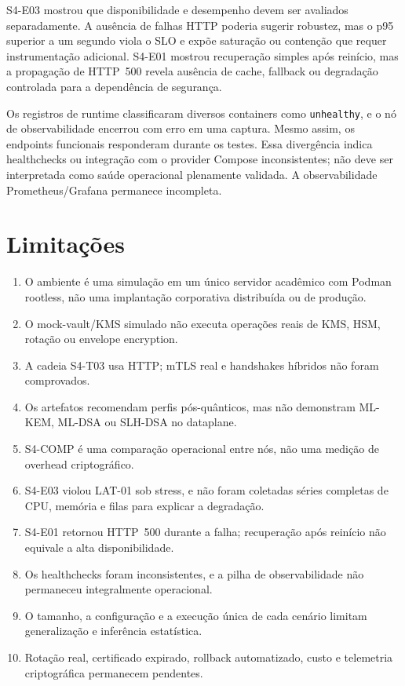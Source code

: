\documentclass[12pt]{article}
\begin{document}
S4-E03 mostrou que disponibilidade e desempenho devem ser avaliados separadamente. A aus\^encia de falhas HTTP poderia sugerir robustez, mas o p95 superior a um segundo viola o SLO e exp\~oe satura\c{c}\~ao ou conten\c{c}\~ao que requer instrumenta\c{c}\~ao adicional. S4-E01 mostrou recupera\c{c}\~ao simples ap\'os rein\'icio, mas a propaga\c{c}\~ao de HTTP~500 revela aus\^encia de cache, fallback ou degrada\c{c}\~ao controlada para a depend\^encia de seguran\c{c}a.

Os registros de runtime classificaram diversos containers como \texttt{unhealthy}, e o n\'o de observabilidade encerrou com erro em uma captura. Mesmo assim, os endpoints funcionais responderam durante os testes. Essa diverg\^encia indica healthchecks ou integra\c{c}\~ao com o provider Compose inconsistentes; n\~ao deve ser interpretada como sa\'ude operacional plenamente validada. A observabilidade Prometheus/Grafana permanece incompleta.

\section{Limita\c{c}\~oes}
\begin{enumerate}
\item O ambiente \'e uma simula\c{c}\~ao em um \'unico servidor acad\^emico com Podman rootless, n\~ao uma implanta\c{c}\~ao corporativa distribu\'ida ou de produ\c{c}\~ao.
\item O mock-vault/KMS simulado n\~ao executa opera\c{c}\~oes reais de KMS, HSM, rota\c{c}\~ao ou envelope encryption.
\item A cadeia S4-T03 usa HTTP; mTLS real e handshakes h\'ibridos n\~ao foram comprovados.
\item Os artefatos recomendam perfis p\'os-qu\^anticos, mas n\~ao demonstram ML-KEM, ML-DSA ou SLH-DSA no dataplane.
\item S4-COMP \'e uma compara\c{c}\~ao operacional entre n\'os, n\~ao uma medi\c{c}\~ao de overhead criptogr\'afico.
\item S4-E03 violou LAT-01 sob stress, e n\~ao foram coletadas s\'eries completas de CPU, mem\'oria e filas para explicar a degrada\c{c}\~ao.
\item S4-E01 retornou HTTP~500 durante a falha; recupera\c{c}\~ao ap\'os rein\'icio n\~ao equivale a alta disponibilidade.
\item Os healthchecks foram inconsistentes, e a pilha de observabilidade n\~ao permaneceu integralmente operacional.
\item O tamanho, a configura\c{c}\~ao e a execu\c{c}\~ao \'unica de cada cen\'ario limitam generaliza\c{c}\~ao e infer\^encia estat\'istica.
\item Rota\c{c}\~ao real, certificado expirado, rollback automatizado, custo e telemetria criptogr\'afica permanecem pendentes.
\end{enumerate}
\end{document}
